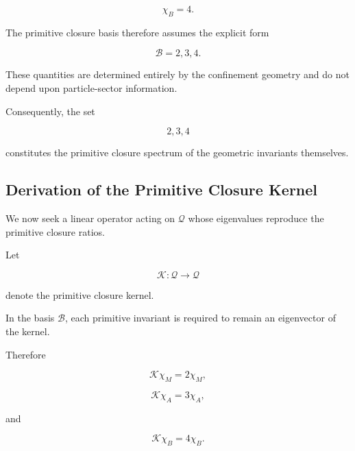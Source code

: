 \documentclass[11pt]{article}
\theoremstyle{definition}
\theoremstyle{remark}
\begin{document}
\begin{equation}
\chi_B = 4.
\end{equation}

The primitive closure basis therefore assumes the explicit form

\begin{equation}
\mathcal B = {2,3,4}.
\label{eq:primitive_basis}
\end{equation}

These quantities are determined entirely by the confinement
geometry and do not depend upon particle-sector information.

Consequently, the set

\begin{equation}
{2,3,4}
\end{equation}

constitutes the primitive closure spectrum of the geometric
invariants themselves.


\subsection{Derivation of the Primitive Closure Kernel}
\label{subsec:derivation_primitive_kernel}

We now seek a linear operator acting on \(\mathcal Q\)
whose eigenvalues reproduce the primitive closure ratios.

Let

\begin{equation}
\mathcal K
:
\mathcal Q
\rightarrow
\mathcal Q
\end{equation}

denote the primitive closure kernel.

In the basis \(\mathcal B\), each primitive invariant is
required to remain an eigenvector of the kernel.

Therefore

\begin{equation}
\mathcal K \chi_M = 2\chi_M,
\end{equation}

\begin{equation}
\mathcal K \chi_A = 3\chi_A,
\end{equation}

and

\begin{equation}
\mathcal K \chi_B = 4\chi_B.
\end{equation}
\end{document}
